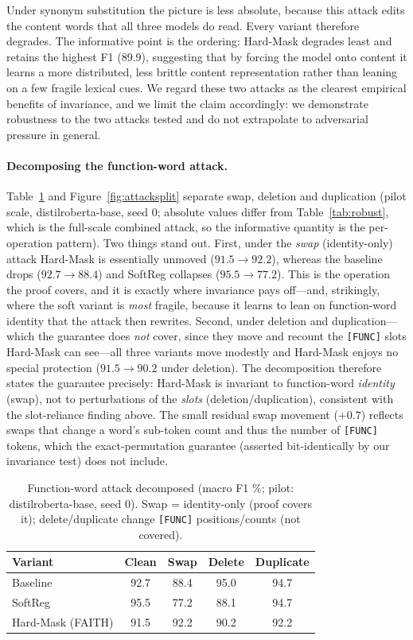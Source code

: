 \documentclass[10pt,twocolumn]{article}
\begin{document}
Under synonym substitution the picture is less absolute, because this attack edits the content words that all three models do read. Every variant therefore degrades. The informative point is the ordering: Hard-Mask degrades least and retains the highest F1 (89.9), suggesting that by forcing the model onto content it learns a more distributed, less brittle content representation rather than leaning on a few fragile lexical cues. We regard these two attacks as the clearest empirical benefits of invariance, and we limit the claim accordingly: we demonstrate robustness to the two attacks tested and do not extrapolate to adversarial pressure in general.

\paragraph{Decomposing the function-word attack.} Table~\ref{tab:attacksplit} and Figure~\ref{fig:attacksplit} separate swap, deletion and duplication (pilot scale, distilroberta-base, seed 0; absolute values differ from Table~\ref{tab:robust}, which is the full-scale combined attack, so the informative quantity is the per-operation pattern). Two things stand out. First, under the \emph{swap} (identity-only) attack Hard-Mask is essentially unmoved ($91.5\to92.2$), whereas the baseline drops ($92.7\to88.4$) and SoftReg collapses ($95.5\to77.2$). This is the operation the proof covers, and it is exactly where invariance pays off---and, strikingly, where the soft variant is \emph{most} fragile, because it learns to lean on function-word identity that the attack then rewrites. Second, under deletion and duplication---which the guarantee does \emph{not} cover, since they move and recount the \texttt{[FUNC]} slots Hard-Mask can see---all three variants move modestly and Hard-Mask enjoys no special protection ($91.5\to90.2$ under deletion). The decomposition therefore states the guarantee precisely: Hard-Mask is invariant to function-word \emph{identity} (swap), not to perturbations of the \emph{slots} (deletion/duplication), consistent with the slot-reliance finding above. The small residual swap movement ($+0.7$) reflects swaps that change a word's sub-token count and thus the number of \texttt{[FUNC]} tokens, which the exact-permutation guarantee (asserted bit-identically by our invariance test) does not include.

\begin{table}[tb]\centering
\caption{Function-word attack decomposed (macro F1 \%; pilot: distilroberta-base, seed 0). Swap = identity-only (proof covers it); delete/duplicate change \texttt{[FUNC]} positions/counts (not covered).}
\label{tab:attacksplit}
\footnotesize
\begin{tabular}{lcccc}
\toprule
Variant & Clean & Swap & Delete & Duplicate \\
\midrule
Baseline & 92.7 & 88.4 & 95.0 & 94.7 \\
SoftReg & 95.5 & 77.2 & 88.1 & 94.7 \\
Hard-Mask (FAITH) & 91.5 & 92.2 & 90.2 & 92.2 \\
\bottomrule
\end{tabular}
\end{table}
\end{document}
